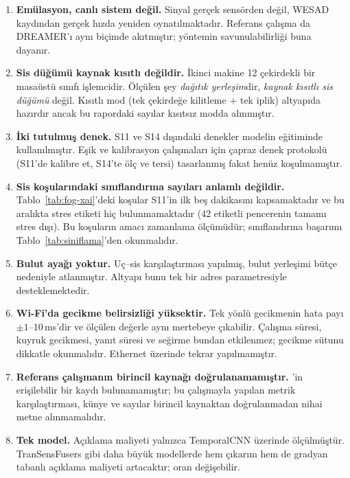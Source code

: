 \documentclass[conference]{IEEEtran}
\newcommand{\ms}{\,ms\xspace}
\begin{document}
\begin{enumerate}
\item \textbf{Emülasyon, canlı sistem değil.} Sinyal gerçek sensörden değil,
WESAD kaydından gerçek hızda yeniden oynatılmaktadır. Referans çalışma
\cite{erzurumluoglu2025} da DREAMER'ı aynı biçimde akıtmıştır; yöntemin
savunulabilirliği buna dayanır.

\item \textbf{Sis düğümü kaynak kısıtlı değildir.} İkinci makine 12 çekirdekli
bir masaüstü sınıfı işlemcidir. Ölçülen şey \emph{dağıtık yerleşim}dir,
\emph{kaynak kısıtlı sis düğümü} değil. Kısıtlı mod (tek çekirdeğe kilitleme +
tek iplik) altyapıda hazırdır ancak bu rapordaki sayılar kısıtsız modda
alınmıştır.

\item \textbf{İki tutulmuş denek.} S11 ve S14 dışındaki denekler modelin
eğitiminde kullanılmıştır. Eşik ve kalibrasyon çalışmaları için çapraz denek
protokolü (S11'de kalibre et, S14'te ölç ve tersi) tasarlanmış fakat henüz
koşulmamıştır.

\item \textbf{Sis koşularındaki sınıflandırma sayıları anlamlı değildir.}
Tablo~\ref{tab:fog-xai}'deki koşular S11'in ilk beş dakikasını kapsamaktadır ve
bu aralıkta stres etiketi hiç bulunmamaktadır (42 etiketli pencerenin tamamı
stres dışı). Bu koşuların amacı zamanlama ölçümüdür; sınıflandırma başarımı
Tablo~\ref{tab:siniflama}'den okunmalıdır.

\item \textbf{Bulut ayağı yoktur.} Uç--sis karşılaştırması yapılmış, bulut
yerleşimi bütçe nedeniyle atlanmıştır. Altyapı bunu tek bir adres parametresiyle
desteklemektedir.

\item \textbf{Wi-Fi'da gecikme belirsizliği yüksektir.} Tek yönlü gecikmenin hata
payı $\pm1$--$10$\ms'dir ve ölçülen değerle aynı mertebeye çıkabilir. Çalışma
süresi, kuyruk gecikmesi, yanıt süresi ve seğirme bundan etkilenmez; gecikme
sütunu dikkatle okunmalıdır. Ethernet üzerinde tekrar yapılmamıştır.

\item \textbf{Referans çalışmanın birincil kaynağı doğrulanamamıştır.}
\cite{erzurumluoglu2025}'in erişilebilir bir kaydı bulunamamıştır; bu çalışmayla
yapılan metrik karşılaştırması, künye ve sayılar birincil kaynaktan
doğrulanmadan nihai metne alınmamalıdır.

\item \textbf{Tek model.} Açıklama maliyeti yalnızca TemporalCNN üzerinde
ölçülmüştür. TranSensFusers gibi daha büyük modellerde hem çıkarım hem de
gradyan tabanlı açıklama maliyeti artacaktır; oran değişebilir.
\end{enumerate}
\end{document}
